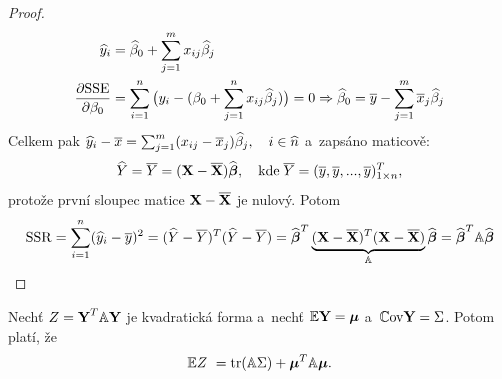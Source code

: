 \begin{proof}
	
\begin{align*}
	\hyi & = \wbeta_0 + \sumjm x_{ij} \wbeta_j \\
	\frac{\partial \SSE}{\partial \beta_0} & = \sum_{i = 1}^n \big(y_i - (\beta_0 + \sumjn x_{ij} \wbeta_j) \big) = 0 \Rightarrow \wbeta_0 = \ly - \sumjm \lx_j \wbeta_j
\end{align*}
Celkem pak $\hy_i - \lx = \sumjm (x_{ij} - \lx_j) \wbeta_j, \quad i\in\widehat{n} $ a~zapsáno maticově:
 $$
\hY = \lY = (\X - \lX) \wbetab, \quad \text{kde} \; \lY = (\ly, \ly,..., \ly)_{1 \times n}^T,
 $$
protože první sloupec matice $\X - \lX$ je nulový. Potom
 $$
\SSR = \sum_{i = 1}^n (\hy_i - \ly)^2 = (\hY - \lY)^T(\hY - \lY) = \wbetab^T \underbrace{(\X - \lX)^T(\X - \lX)}_{\Am} \wbetab = \wbetab^T \Am \wbetab
 $$

\end{proof}

\begin{theorem}
	Nechť $Z = \Y^T \Am \Y$ je kvadratická forma a~nechť $\E \Y = \bmu$ a~$\Cov \Y = \Sigma$. Potom platí, že
	 $$
		\E Z~ = \trace(\Am \Sigma) + \bmu^T \Am \bmu.
	 $$
\end{theorem}

